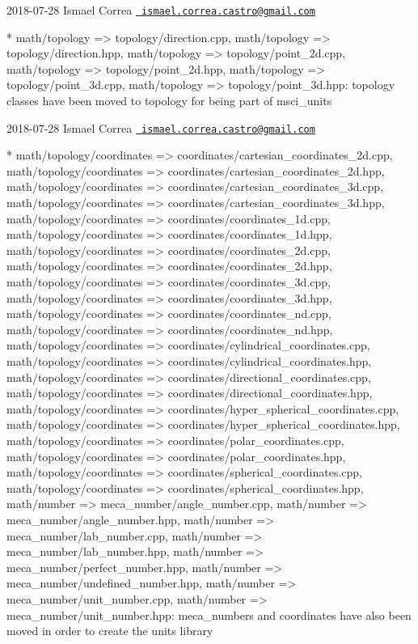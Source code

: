  2018-\/07-\/28 Ismael Correa \href{mailto:ismael.correa.castro@gmail.com}{\texttt{ ismael.\+correa.\+castro@gmail.\+com}} \begin{DoxyVerb}* {math/topology => topology}/direction.cpp, {math/topology =>
topology}/direction.hpp, {math/topology => topology}/point_2d.cpp,
{math/topology => topology}/point_2d.hpp, {math/topology =>
topology}/point_3d.cpp, {math/topology => topology}/point_3d.hpp: 
topology classes have been moved to topology for being part of
msci_units
\end{DoxyVerb}
 2018-\/07-\/28 Ismael Correa \href{mailto:ismael.correa.castro@gmail.com}{\texttt{ ismael.\+correa.\+castro@gmail.\+com}} \begin{DoxyVerb}* {math/topology/coordinates =>
coordinates}/cartesian_coordinates_2d.cpp,
{math/topology/coordinates =>
coordinates}/cartesian_coordinates_2d.hpp,
{math/topology/coordinates =>
coordinates}/cartesian_coordinates_3d.cpp,
{math/topology/coordinates =>
coordinates}/cartesian_coordinates_3d.hpp,
{math/topology/coordinates => coordinates}/coordinates_1d.cpp,
{math/topology/coordinates => coordinates}/coordinates_1d.hpp,
{math/topology/coordinates => coordinates}/coordinates_2d.cpp,
{math/topology/coordinates => coordinates}/coordinates_2d.hpp,
{math/topology/coordinates => coordinates}/coordinates_3d.cpp,
{math/topology/coordinates => coordinates}/coordinates_3d.hpp,
{math/topology/coordinates => coordinates}/coordinates_nd.cpp,
{math/topology/coordinates => coordinates}/coordinates_nd.hpp,
{math/topology/coordinates =>
coordinates}/cylindrical_coordinates.cpp,
{math/topology/coordinates =>
coordinates}/cylindrical_coordinates.hpp,
{math/topology/coordinates =>
coordinates}/directional_coordinates.cpp,
{math/topology/coordinates =>
coordinates}/directional_coordinates.hpp,
{math/topology/coordinates =>
coordinates}/hyper_spherical_coordinates.cpp,
{math/topology/coordinates =>
coordinates}/hyper_spherical_coordinates.hpp,
{math/topology/coordinates => coordinates}/polar_coordinates.cpp,
{math/topology/coordinates => coordinates}/polar_coordinates.hpp,
{math/topology/coordinates =>
coordinates}/spherical_coordinates.cpp, {math/topology/coordinates
=> coordinates}/spherical_coordinates.hpp, {math/number =>
meca_number}/angle_number.cpp, {math/number =>
meca_number}/angle_number.hpp, {math/number =>
meca_number}/lab_number.cpp, {math/number =>
meca_number}/lab_number.hpp, {math/number =>
meca_number}/perfect_number.hpp, {math/number =>
meca_number}/undefined_number.hpp, {math/number =>
meca_number}/unit_number.cpp, {math/number =>
meca_number}/unit_number.hpp: meca_numbers and coordinates have also
been moved in order to create the units library
\end{DoxyVerb}
